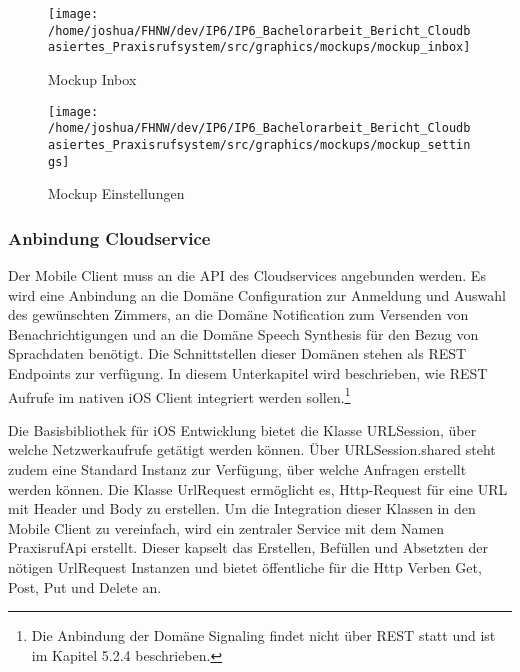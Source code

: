 \begin{figure}[h]
    \centering
    \begin{minipage}[b]{0.4\textwidth}
        \texttt{[image: /home/joshua/FHNW/dev/IP6/IP6\_Bachelorarbeit\_Bericht\_Cloudbasiertes\_Praxisrufsystem/src/graphics/mockups/mockup\_inbox]}
        \caption{Mockup Inbox}
    \end{minipage}
    \hfill
    \begin{minipage}[b]{0.4\textwidth}
        \texttt{[image: /home/joshua/FHNW/dev/IP6/IP6\_Bachelorarbeit\_Bericht\_Cloudbasiertes\_Praxisrufsystem/src/graphics/mockups/mockup\_settings]}
        \caption{Mockup Einstellungen}
    \end{minipage}\label{fig:Mockups-Inbox-Settings}
\end{figure}


\subsubsection{Anbindung Cloudservice}

Der Mobile Client muss an die API des Cloudservices angebunden werden.
Es wird eine Anbindung an die Domäne Configuration zur Anmeldung und Auswahl des gewünschten Zimmers, an die Domäne Notification zum Versenden von Benachrichtigungen und an die Domäne Speech Synthesis für den Bezug von Sprachdaten benötigt.
Die Schnittstellen dieser Domänen stehen als REST Endpoints zur verfügung.
In diesem Unterkapitel wird beschrieben, wie REST Aufrufe im nativen iOS Client integriert werden sollen.\footnote{Die Anbindung der Domäne Signaling findet nicht über REST statt und ist im Kapitel 5.2.4 beschrieben.}

Die Basisbibliothek für iOS Entwicklung bietet die Klasse URLSession, über welche Netzwerkaufrufe getätigt werden können.
Über URLSession.shared steht zudem eine Standard Instanz zur Verfügung, über welche Anfragen erstellt werden können.\cite{ios_urlsession}
Die Klasse UrlRequest ermöglicht es, Http-Request für eine URL mit Header und Body zu erstellen.\cite{ios_urlrequest}
Um die Integration dieser Klassen in den Mobile Client zu vereinfach, wird ein zentraler Service mit dem Namen PraxisrufApi erstellt.
Dieser kapselt das Erstellen, Befüllen und Absetzten der nötigen UrlRequest Instanzen und bietet öffentliche für die Http Verben Get, Post, Put und Delete an.




